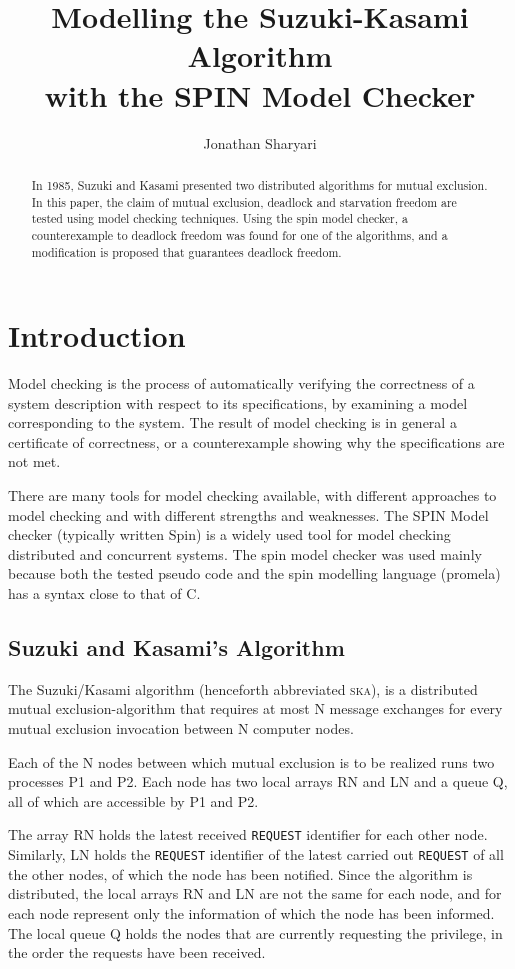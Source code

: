 \documentclass[a4paper,10pt]{llncs}
\title{\textbf{Modelling the Suzuki-Kasami Algorithm\\ with the SPIN Model Checker}}
\author{Jonathan Sharyari}
\institute{Freie Universit{\"a}t Berlin, Computer Science Department\\
Takustra{\ss}e 9. 14195 Berlin, Germany\\
\mailsa
}
\begin{document}
\maketitle


\begin{abstract}
In 1985, Suzuki and Kasami presented two distributed algorithms for mutual exclusion. In this paper, the claim of mutual exclusion, deadlock and starvation freedom are tested using model checking techniques. Using the spin model checker, a counterexample to deadlock freedom was found for one of the algorithms, and a modification is proposed that guarantees deadlock freedom.
\end{abstract}


\section{Introduction}
Model checking is the process of automatically verifying the correctness of a system description with respect to its specifications, by examining a model corresponding to the system. The result of model checking is in general a certificate of correctness, or a counterexample showing why the specifications are not met.

There are many tools for model checking available, with different approaches to model checking and with different strengths and weaknesses. The SPIN Model checker (typically written Spin) is a widely used tool for model checking distributed and concurrent systems. The spin model checker was used mainly because both the tested pseudo code and the spin modelling language (promela) has a syntax close to that of C.


\subsection{Suzuki and Kasami's Algorithm}

The Suzuki/Kasami algorithm\cite{Suzuki} (henceforth abbreviated \textsc{ska}), is a distributed mutual exclusion-algorithm that requires at most N message exchanges for every mutual exclusion invocation between N computer nodes.

Each of the N nodes between which mutual exclusion is to be realized runs two processes P1 and P2. Each node has two local arrays RN and LN and a queue Q, all of which are accessible by P1 and P2.

The array RN holds the latest received \texttt{REQUEST} identifier for each other node. Similarly, LN holds the \texttt{REQUEST} identifier of the latest carried out \texttt{REQUEST} of all the other nodes, of which the node has been notified. Since the algorithm is distributed, the local arrays RN and LN are not the same for each node, and for each node represent only the information of which the node has been informed.
The local queue Q holds the nodes that are currently requesting the privilege, in the order the requests have been received.
\end{document}
